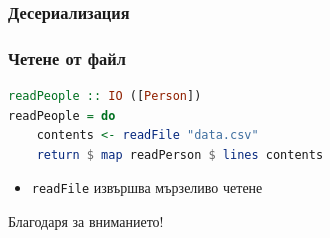 \documentclass{beamer}
\begin{document}
\begin{frame}[fragile]
  \frametitle{Десериализация}
\end{frame}


\begin{frame}[fragile]
  \frametitle{Четене от файл}


\begin{lstlisting}[basicstyle=\small,language=Haskell]
readPeople :: IO ([Person])
readPeople = do
    contents <- readFile "data.csv"
    return $ map readPerson $ lines contents  
\end{lstlisting}

\bigskip

\begin{itemize}
  \item \verb#readFile# извършва мързеливо четене
\end{itemize}


\end{frame}



\begin{frame}
  \centerline{Благодаря за вниманието!}
\end{frame}
\end{document}
